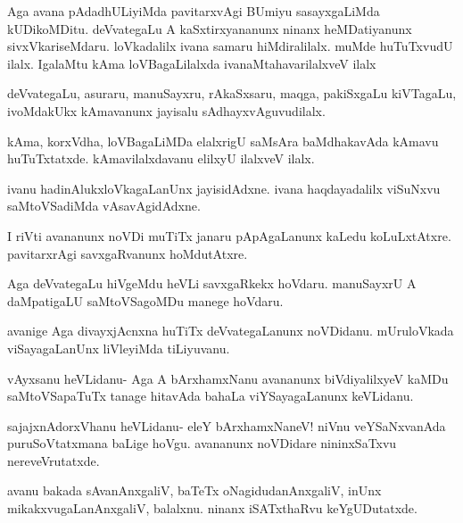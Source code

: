 \documentclass{article}
\begin{document}
\begin{mng}%
Aga avana pAdadhULiyiMda pavitarxvAgi BUmiyu
sasayxgaLiMda kUDikoMDitu. deVvategaLu A kaSxtirxyananunx ninanx heMDatiyanunx
sivxVkariseMdaru. loVkadalilx ivana samaru hiMdiralilalx. muMde huTuTxvudU
ilalx. IgalaMtu kAma loVBagaLilalxda ivanaMtahavarilalxveV ilalx
\end{mng}

\begin{mng}%
deVvategaLu, asuraru, manuSayxru, rAkaSxsaru, maqga, pakiSxgaLu
kiVTagaLu, ivoMdakUkx kAmavanunx jayisalu sAdhayxvAguvudilalx.
\end{mng}

\begin{mng}%
kAma, korxVdha, loVBagaLiMDa elalxrigU saMsAra baMdhakavAda
kAmavu huTuTxtatxde. kAmavilalxdavanu elilxyU ilalxveV ilalx.
\end{mng}

\begin{mng}%
ivanu hadinAlukxloVkagaLanUnx jayisidAdxne. ivana haqdayadalilx
viSuNxvu saMtoVSadiMda vAsavAgidAdxne.
\end{mng}

\begin{mng}%
I riVti avananunx noVDi muTiTx janaru pApAgaLanunx kaLedu
koLuLxtAtxre. pavitarxrAgi savxgaRvanunx hoMdutAtxre.
\end{mng}

\begin{mng}%
Aga deVvategaLu hiVgeMdu heVLi savxgaRkekx hoVdaru.
manuSayxrU A daMpatigaLU saMtoVSagoMDu manege hoVdaru.
\end{mng}

\begin{mng}%
avanige Aga divayxjAcnxna huTiTx deVvategaLanunx noVDidanu. 
mUruloVkada viSayagaLanUnx liVleyiMda tiLiyuvanu.
\end{mng}

\begin{mng}%
vAyxsanu heVLidanu- Aga A bArxhamxNanu avananunx biVdiyalilxyeV
kaMDu saMtoVSapaTuTx tanage hitavAda bahaLa viYSayagaLanunx
keVLidanu.
\end{mng}

\begin{mng}%
sajajxnAdorxVhanu heVLidanu- eleY bArxhamxNaneV! niVnu
veYSaNxvanAda puruSoVtatxmana baLige hoVgu. avananunx noVDidare nininxSaTxvu
nereveVrutatxde.
\end{mng}

\begin{mng}%
avanu bakada sAvanAnxgaliV, baTeTx oNagidudanAnxgaliV, inUnx
mikakxvugaLanAnxgaliV, balalxnu. ninanx iSATxthaRvu keYgUDutatxde.
\end{mng}
\end{document}
